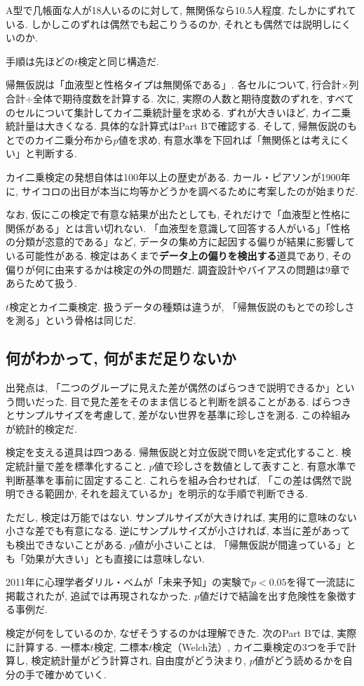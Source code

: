     A型で几帳面な人が18人いるのに対して, 無関係なら10.5人程度.
    たしかにずれている.
    しかしこのずれは偶然でも起こりうるのか, それとも偶然では説明しにくいのか.

    手順は先ほどの$t$検定と同じ構造だ.

    帰無仮説は「血液型と性格タイプは無関係である」.
    各セルについて, 行合計$\times$列合計$\div$全体で期待度数を計算する.
    次に, 実際の人数と期待度数のずれを, すべてのセルについて集計してカイ二乗統計量を求める.
    ずれが大きいほど, カイ二乗統計量は大きくなる.
    具体的な計算式はPart Bで確認する.
    そして, 帰無仮説のもとでのカイ二乗分布から$p$値を求め, 有意水準を下回れば「無関係とは考えにくい」と判断する.

    カイ二乗検定の発想自体は100年以上の歴史がある.
    カール・ピアソンが1900年に, サイコロの出目が本当に均等かどうかを調べるために考案したのが始まりだ.

    なお, 仮にこの検定で有意な結果が出たとしても, それだけで「血液型と性格に関係がある」とは言い切れない.
    「血液型を意識して回答する人がいる」「性格の分類が恣意的である」など, データの集め方に起因する偏りが結果に影響している可能性がある.
    検定はあくまで\textbf{データ上の偏りを検出する}道具であり, その偏りが何に由来するかは検定の外の問題だ.
    調査設計やバイアスの問題は9章であらためて扱う.

    $t$検定とカイ二乗検定. 扱うデータの種類は違うが, 「帰無仮説のもとでの珍しさを測る」という骨格は同じだ.


  \subsection{何がわかって, 何がまだ足りないか}

    出発点は, 「二つのグループに見えた差が偶然のばらつきで説明できるか」という問いだった.
    目で見た差をそのまま信じると判断を誤ることがある.
    ばらつきとサンプルサイズを考慮して, 差がない世界を基準に珍しさを測る.
    この枠組みが統計的検定だ.

    検定を支える道具は四つある.
    帰無仮説と対立仮説で問いを定式化すること.
    検定統計量で差を標準化すること.
    $p$値で珍しさを数値として表すこと.
    有意水準で判断基準を事前に固定すること.
    これらを組み合わせれば, 「この差は偶然で説明できる範囲か, それを超えているか」を明示的な手順で判断できる.

    ただし, 検定は万能ではない.
    サンプルサイズが大きければ, 実用的に意味のない小さな差でも有意になる.
    逆にサンプルサイズが小さければ, 本当に差があっても検出できないことがある.
    $p$値が小さいことは, 「帰無仮説が間違っている」とも「効果が大きい」とも直接には意味しない.

    2011年に心理学者ダリル・ベムが「未来予知」の実験で$p < 0.05$を得て一流誌に掲載されたが, 追試では再現されなかった.
    $p$値だけで結論を出す危険性を象徴する事例だ.

    検定が何をしているのか, なぜそうするのかは理解できた.
    次のPart Bでは, 実際に計算する.
    一標本$t$検定, 二標本$t$検定（Welch法）, カイ二乗検定の3つを手で計算し,
    検定統計量がどう計算され, 自由度がどう決まり, $p$値がどう読めるかを自分の手で確かめていく.
